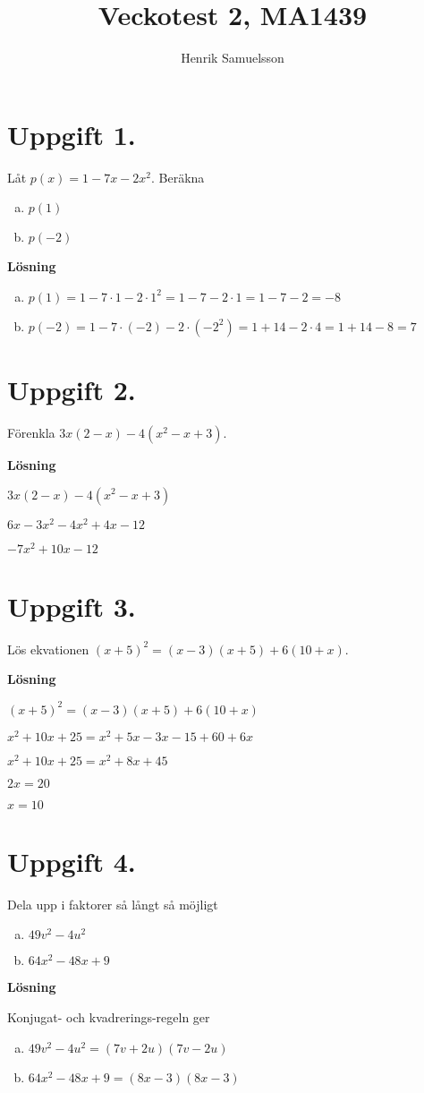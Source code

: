 \documentclass{article}
\begin{document}
\title{Veckotest 2, MA1439}
\author{Henrik Samuelsson}
\maketitle

\section*{Uppgift 1.} 
Låt $p(x)=1-7x-2x^2$. Beräkna

\begin{enumerate}[(a)]
\item $p(1)$
\item $p(-2)$
\end{enumerate}

\textbf{Lösning}

\begin{enumerate}[(a)]
\item $p(1) = 1 - 7 \cdot 1 - 2 \cdot 1^2 = 1 - 7 - 2 \cdot 1 = 1 - 7 - 2 = -8$
\item $p(-2)= 1 - 7 \cdot (-2) - 2 \cdot (-2^2) = 1 + 14 - 2\cdot 4 = 1 + 14 - 8 = 7$
\end{enumerate}

\section*{Uppgift 2.} 
Förenkla $3x(2-x)-4(x^2-x+3)$.

\textbf{Lösning}

$3x(2-x)-4(x^2-x+3)$

$6x-3x^2-4x^2+4x-12$

$-7x^2+10x-12$

\section*{Uppgift 3.} 
Lös ekvationen $(x+5)^2=(x-3)(x+5)+6(10+x)$.

\textbf{Lösning}

$(x+5)^2=(x-3)(x+5)+6(10+x)$

$x^2+10x+25=x^2+5x-3x-15+60+6x$

$x^2+10x+25=x^2+8x+45$

$2x=20$

$x=10$

\section*{Uppgift 4.} 
Dela upp i faktorer så långt så möjligt
\begin{enumerate}[(a)]
\item $49v^2-4u^2$
\item $64x^2-48x+9$
\end{enumerate}

\textbf{Lösning}

Konjugat- och kvadrerings-regeln ger
\begin{enumerate}[(a)]
\item $49v^2-4u^2=(7v+2u)(7v-2u)$
\item $64x^2-48x+9=(8x-3)(8x-3)$
\end{enumerate}
\end{document}
